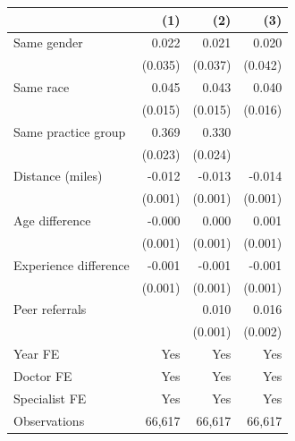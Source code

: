 
\begin{tabular}{lrrr}
\toprule
 & (1) & (2) & (3)\\
\midrule
Same gender & 0.022 & 0.021 & 0.020\\
 & (0.035) & (0.037) & (0.042)\\
Same race & 0.045 & 0.043 & 0.040\\
 & (0.015) & (0.015) & (0.016)\\
Same practice group & 0.369 & 0.330 & \\
 & (0.023) & (0.024) & \\
Distance (miles) & -0.012 & -0.013 & -0.014\\
 & (0.001) & (0.001) & (0.001)\\
Age difference & -0.000 & 0.000 & 0.001\\
 & (0.001) & (0.001) & (0.001)\\
Experience difference & -0.001 & -0.001 & -0.001\\
 & (0.001) & (0.001) & (0.001)\\
Peer referrals &  & 0.010 & 0.016\\
 &  & (0.001) & (0.002)\\
Year FE & Yes & Yes & Yes\\
Doctor FE & Yes & Yes & Yes\\
Specialist FE & Yes & Yes & Yes\\
Observations & 66,617 & 66,617 & 66,617\\
\bottomrule
\end{tabular}
